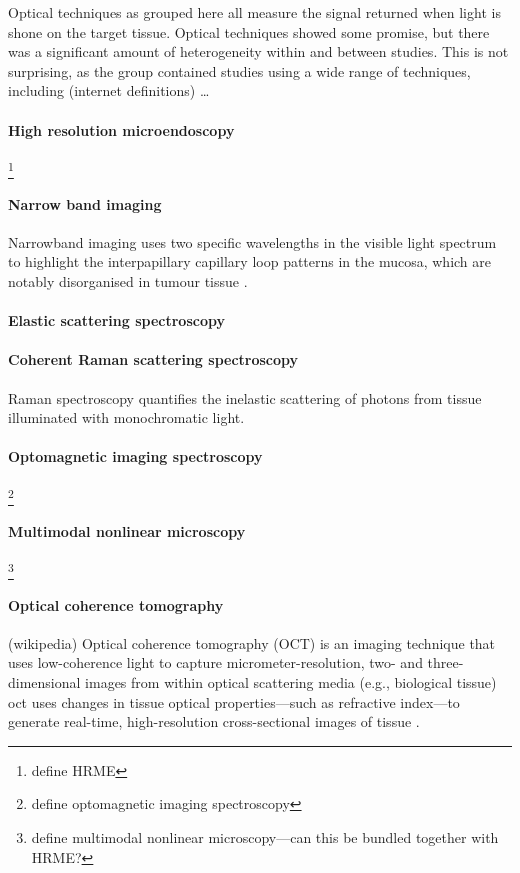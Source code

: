Optical techniques as grouped here all measure the signal returned when light is shone on the target tissue.
Optical techniques showed some promise, but there was a significant amount of heterogeneity within and between studies. 
This is not surprising, as the group contained studies using a wide range of techniques, including (internet definitions) \ldots

\paragraph{High resolution microendoscopy} \cite{vilap.m.DiscriminationBenignNeoplastic2012, milesb.a.OperativeMarginControl2015}\footnote{define HRME}
\paragraph{Narrow band imaging} \cite{tirelliNarrowBandImaging2015, tirellig.TailoredResectionsOral2018}Narrowband imaging uses two specific wavelengths in the visible light spectrum to highlight the interpapillary capillary loop patterns in the mucosa, which are notably disorganised in tumour tissue \cite{vuEfficacyNarrowBand2014}.
\paragraph{Elastic scattering spectroscopy} \cite{grilloneg.a.ColorCancerMargin2017}
\paragraph{Coherent Raman scattering spectroscopy} \cite{hoeslir.c.CoherentRamanScattering2017} Raman spectroscopy quantifies the inelastic scattering of photons from tissue illuminated with monochromatic light.
\paragraph{Optomagnetic imaging spectroscopy} \cite{lisulb.PredictiveValueOptomagnetic2019}\footnote{define optomagnetic imaging spectroscopy} 
\paragraph{Multimodal nonlinear microscopy} \cite{heukes.MultimodalNonlinearMicroscopy2016}\footnote{define multimodal nonlinear microscopy---can this be bundled together with HRME?} 
\paragraph{Optical coherence tomography} (wikipedia) Optical coherence tomography (OCT) is an imaging technique that uses low-coherence light to capture micrometer-resolution, two- and three-dimensional images from within optical scattering media (e.g., biological tissue) \cite{hamdoonz.OpticalCoherenceTomography2016} \Gls{oct} uses changes in tissue optical properties---such as refractive index---to generate real-time, high-resolution cross-sectional images of tissue \cite{heidaria.e.UseOpticalCoherence2020}.
